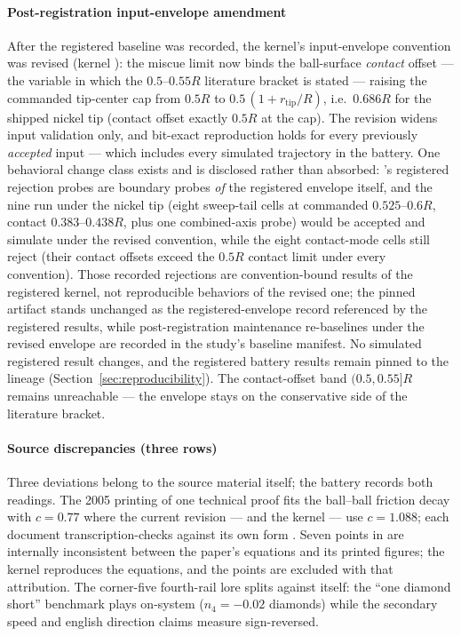 \paragraph{Post-registration input-envelope amendment}
After the registered baseline was recorded, the kernel's input-envelope
convention was revised (kernel
): the miscue limit now binds the ball-surface
\emph{contact} offset --- the variable in which the $0.5$--$0.55R$
literature bracket is stated --- raising the commanded tip-center cap
from $0.5R$ to $0.5\,(1 + r_{\mathrm{tip}}/R)$, i.e.\ $0.686R$ for the
shipped nickel tip (contact offset exactly $0.5R$ at the cap). The
revision widens input validation only, and bit-exact reproduction
holds for every previously \emph{accepted} input --- which includes
every simulated trajectory in the battery. One behavioral change class
exists and is disclosed rather than absorbed: 's registered
rejection probes are boundary probes \emph{of} the registered envelope
itself, and the nine run under the nickel tip (eight sweep-tail cells
at commanded $0.525$--$0.6R$, contact $0.383$--$0.438R$, plus one
combined-axis probe) would be accepted and simulate under the revised
convention, while the eight contact-mode cells still reject (their
contact offsets exceed the $0.5R$ contact limit under every
convention). Those recorded rejections are convention-bound results of
the registered kernel, not reproducible behaviors of the revised one;
the pinned  artifact stands unchanged as the
registered-envelope record referenced by the registered results, while
post-registration maintenance re-baselines under the revised envelope
are recorded in the study's baseline manifest. No simulated
registered result changes, and the registered battery results remain
pinned to the  lineage
(Section~\ref{sec:reproducibility}). The contact-offset band
$(0.5, 0.55]R$ remains unreachable --- the envelope stays on the
conservative side of the literature bracket.

\paragraph{Source discrepancies (three rows)}
Three deviations belong to the source material itself; the battery
records both readings. The 2005 printing of one technical proof fits
the ball--ball friction decay with $c = 0.77$ where the current
revision --- and the kernel --- use $c = 1.088$; each document
transcription-checks against its own form
\citep{alciatore_tp_catalog,alciatore_tp_a14}. Seven points in
\citet{mathavan2010cushion} are internally inconsistent between the
paper's equations and its printed figures; the kernel reproduces the
equations, and the points are excluded with that attribution. The corner-five fourth-rail lore
splits against itself: the ``one diamond short'' benchmark plays
on-system ($n_4 = -0.02$ diamonds) while the secondary speed and
english direction claims measure sign-reversed.

